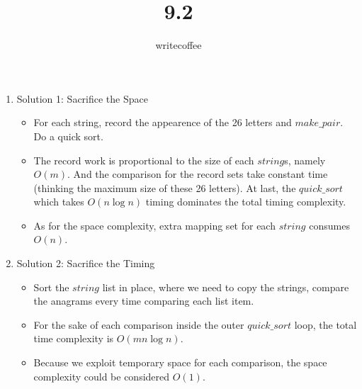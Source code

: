 \documentclass[11pt]{article}
\author{writecoffee} \title{9.2}
\begin{document}
\maketitle

{\setlength{\baselineskip}{1\baselineskip}
\setlength{\parindent}{0pt}
\setlength{\parskip}{2ex plus 0.5ex minus 0.2ex}
\begin{enumerate}[1.]
\item
	Solution 1: Sacrifice the Space
	\begin{itemize}
	\item
		For each string, record the appearence of the 26 letters and $make\_pair$. Do a quick sort.
	\item
		The record work is proportional to the size of each $string$s, namely $O(m)$. %
		And the comparison for the record sets take constant time (thinking the maximum size of these 26 letters). %
		At last, the  $quick\_sort$ which takes $O(n\log{n})$ timing dominates the total timing complexity.
	\item
		As for the space complexity, extra mapping set for each $string$ consumes $O(n)$.
	\end{itemize}
\item
	Solution 2: Sacrifice the Timing
	\begin{itemize}
	\item
		Sort the $string$ list in place, where we need to copy the strings, compare the anagrams every time comparing each list item.
	\item
		For the sake of each comparison inside the outer $quick\_sort$ loop, the total time complexity is $O(mn\log{n})$.
	\item
		Because we exploit temporary space for each comparison, the space complexity could be considered $O(1)$.
	\end{itemize}
\end{enumerate}
\par}
%
%
\end{document}
